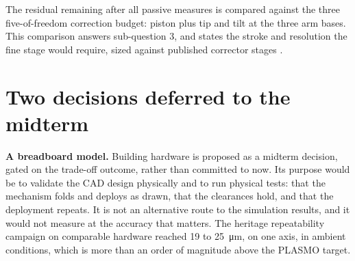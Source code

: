  The residual remaining after all passive measures is compared against the three five-of-freedom correction budget: piston plus tip and tilt at the three arm bases. This comparison answers sub-question 3, and states the stroke and resolution the fine stage would require, sized against published corrector stages \cite{cadiergues_mirror_2003, lu_design_2023}.

\section{Two decisions deferred to the midterm}
\label{sec:deferred}


\textbf{A breadboard model.} Building hardware is proposed as a midterm decision, gated on the trade-off outcome, rather than committed to now. Its purpose would be to validate the CAD design physically and to run physical tests: that the mechanism folds and deploys as drawn, that the clearances hold, and that the deployment repeats. It is not an alternative route to the simulation results, and it would not measure at the accuracy that matters. The heritage repeatability campaign on comparable hardware reached 19 to \SI{25}{\micro\meter}, on one axis, in ambient conditions, which is more than an order of magnitude above the PLASMO target.

